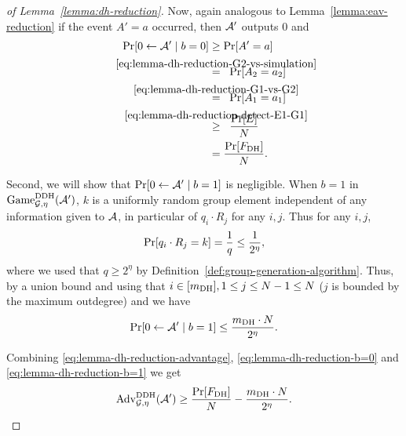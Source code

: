 \begin{proof}[of Lemma~\ref{lemma:dh-reduction}]
	Now, again analogous to Lemma~\ref{lemma:eav-reduction} if the event $A' = a$ occurred, then $\mathcal{A}'$ outputs $0$ and
	\begin{align*}
		\pr{0 \from \adv' \mid b = 0} & \ge \pr{A' = a}                                                                             \\
		                              & \stackrel{\mathclap{\eqref{eq:lemma-dh-reduction-G2-vs-simulation}}}{=} \;\; \pr{A_2 = a_2} \\
		                              & \stackrel{\mathclap{\eqref{eq:lemma-dh-reduction-G1-vs-G2}}}{=} \;\; \pr{A_1 = a_1}         \\
		                              & \stackrel{\mathclap{\eqref{eq:lemma-dh-reduction-detect-E1-G1}}}{\ge} \;\; \frac{\pr{E}}{N} \\
		                              & = \frac{\pr{\fdh}}{N}.
	\end{align*}

	Second, we will show that $\pr{0 \from \adv' \mid b = 1}$ is negligible. When $b = 1$ in $\mathrm{Game}_{\mathcal{G}, \eta}^{\mathrm{DDH}}(\mathcal{A}')$, $k$ is a uniformly random group element independent of any information given to $\mathcal{A}$, in particular of $q_i \cdot R_j$ for any $i, j$. Thus for any $i, j$,
	\[
		\pr{q_i \cdot R_j = k} = \frac{1}{q} \le \frac{1}{2^\eta},
	\]
	where we used that $q \ge 2^\eta$ by Definition~\ref{def:group-generation-algorithm}.
	Thus, by a union bound and using that $i \in [m_\mathrm{DH}], 1 \le j \le N - 1 \le N$ ($j$ is bounded by the maximum outdegree) and  we have
	\begin{equation} \label{eq:lemma-dh-reduction-b=1}
		\pr{0 \from \adv' \mid b = 1} \le \frac{\mdh \cdot N}{2^\eta}.
	\end{equation}

	Combining \eqref{eq:lemma-dh-reduction-advantage}, \eqref{eq:lemma-dh-reduction-b=0} and \eqref{eq:lemma-dh-reduction-b=1} we get
	\begin{align} \label{eq:lemma-dh-reduction-advantage-lower-bound}
		\begin{split}
			\advantage{\mathcal{G}}{\eta}{DDH}(\adv') \ge \frac{\pr{\fdh}}{N} - \frac{\mdh \cdot N}{2^\eta}.
		\end{split}
	\end{align}


\end{proof}
